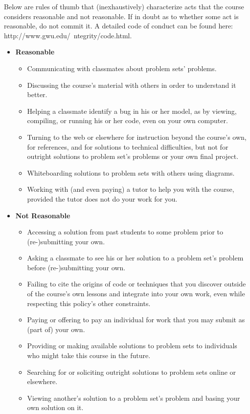 \documentclass[11pt]{article}
\begin{document}
Below are rules of thumb that (inexhaustively) characterize acts that the course considers reasonable and not reasonable. If in doubt as to whether some act is reasonable, do not commit it. A detailed code of conduct can be found here: http://www.gwu.edu/~ntegrity/code.html.
\begin{itemize}
	\item \textbf {Reasonable}
		\begin{itemize}
			\item Communicating with classmates about problem sets' problems.
			\item Discussing the course's material with others in order to understand it better.
			\item Helping a classmate identify a bug in his or her model, as by viewing, compiling, or running his or her code, even on your own computer.
			\item Turning to the web or elsewhere for instruction beyond the course’s own, for references, and for solutions to technical difficulties, but not for outright solutions to problem set's problems or your own final project.
			\item Whiteboarding solutions to problem sets with others using diagrams.
			\item Working with (and even paying) a tutor to help you with the course, provided the tutor does not do your work for you.
		\end{itemize}
	\item \textbf {Not Reasonable}
		\begin{itemize}
		    \item Accessing a solution from past students to some problem prior to (re-)submitting your own.
		    \item Asking a classmate to see his or her solution to a problem set’s problem before (re-)submitting your own.
		    \item Failing to cite the origins of code or techniques that you discover outside of the course's own lessons and integrate into your own work, even while respecting this policy's other constraints.
		    \item Paying or offering to pay an individual for work that you may submit as (part of) your own.
		    \item Providing or making available solutions to problem sets to individuals who might take this course in the future.
		    \item Searching for or soliciting outright solutions to problem sets online or elsewhere.
		    \item Viewing another’s solution to a problem set’s problem and basing your own solution on it.
	    \end{itemize}
\end{itemize}
\end{document}
